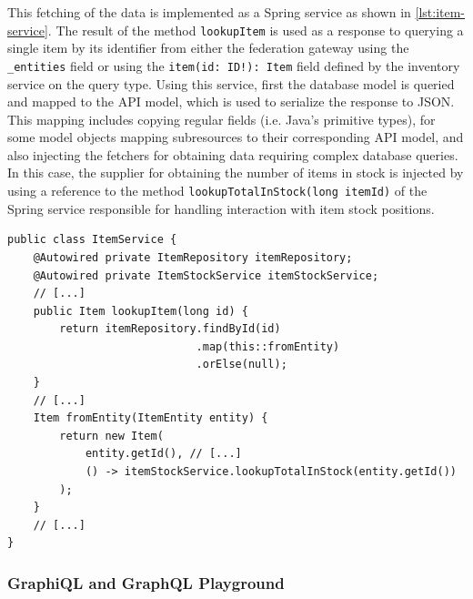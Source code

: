 This fetching of the data is implemented as a Spring service as shown in \autoref{lst:item-service}.
The result of the method \texttt{lookupItem} is used as a response to querying a single item by its identifier from either the federation gateway using the \texttt{\_entities} field or using the \texttt{item(id: ID!): Item} field defined by the inventory service on the query type.
Using this service, first the database model is queried and mapped to the \ac{API} model, which is used to serialize the response to \ac{JSON}.
This mapping includes copying regular fields (i.e. Java's primitive types), for some model objects mapping subresources to their corresponding \ac{API} model, and also injecting the fetchers for obtaining data requiring complex database queries.
In this case, the supplier for obtaining the number of items in stock is injected by using a reference to the method \texttt{lookupTotalInStock(long itemId)} of the Spring service responsible for handling interaction with item stock positions.

\begin{lstlisting}[caption={\acs{API} Model Creation with Fetcher Injection}, style=java-ext, label={lst:item-service}]
public class ItemService {
    @Autowired private ItemRepository itemRepository;
    @Autowired private ItemStockService itemStockService;
    // [...]
    public Item lookupItem(long id) {
        return itemRepository.findById(id)
                             .map(this::fromEntity)
                             .orElse(null);
    }
    // [...]
    Item fromEntity(ItemEntity entity) {
        return new Item(
            entity.getId(), // [...]
            () -> itemStockService.lookupTotalInStock(entity.getId())
        );
    }
    // [...]
}
\end{lstlisting}

\subsubsection{GraphiQL and GraphQL Playground}

